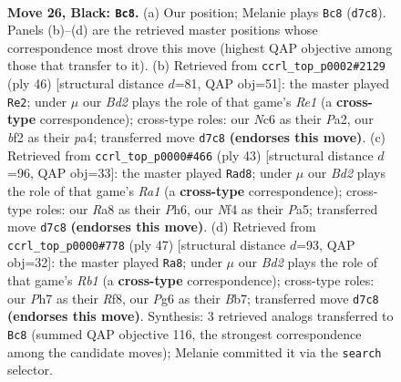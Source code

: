 \documentclass[11pt]{article}
\begin{document}
\clearpage

\begin{figure}[p]\centering
\begin{subfigure}{0.46\textwidth}\centering
\resizebox{\linewidth}{!}{%
\newchessgame
\chessboard[
  setfen={r6r/1q1b1kbp/p1npp1p1/1p2p1P1/4PnQP/2N2P2/PPPK1B2/R1R2B2 b - - 4 26},
  showmover=false,
  pgfstyle=straightmove, color=movearrow, markmove={d7-c8}
]}
\caption{}
\end{subfigure}\hfill
\begin{subfigure}{0.46\textwidth}\centering
\resizebox{\linewidth}{!}{%
\newchessgame
\chessboard[
  setfen={r4rk1/4ppb1/1np3p1/1p2Pq1p/p2PNB1P/2P3P1/P1Q2PK1/2R1R3 w - - 0 24},
  showmover=false,
  pgfstyle=straightmove, color=movearrow, markmove={e1-e2}
]}
\caption{}
\end{subfigure}
\\[4pt]
\begin{subfigure}{0.46\textwidth}\centering
\resizebox{\linewidth}{!}{%
\newchessgame
\chessboard[
  setfen={r3r1k1/1pqb1p2/2ppn2p/p3b1p1/2P1P1P1/1P2BPP1/P2QN1BK/1R2R3 b - - 3 22},
  showmover=false,
  pgfstyle=straightmove, color=movearrow, markmove={a8-d8}
]}
\caption{}
\end{subfigure}\hfill
\begin{subfigure}{0.46\textwidth}\centering
\resizebox{\linewidth}{!}{%
\newchessgame
\chessboard[
  setfen={1r3rk1/1bpq1p1p/n2b2p1/3Pp3/ppQ1P3/4BNP1/P4PBP/1R1R2K1 b - - 1 24},
  showmover=false,
  pgfstyle=straightmove, color=movearrow, markmove={b8-a8}
]}
\caption{}
\end{subfigure}
\caption{\textbf{Move 26, Black: \texttt{Bc8}.} (a) Our position; Melanie plays \texttt{Bc8} (\texttt{d7c8}). Panels (b)--(d) are the retrieved master positions whose correspondence most drove this move (highest QAP objective among those that transfer to it). (b) Retrieved from \texttt{ccrl\_top\_p0002\#2129} (ply 46) [structural distance $d$=81, QAP obj=51]: the master played \texttt{Re2}; under $\mu$ our \emph{Bd2} plays the role of that game's \emph{Re1} (a \textbf{cross-type} correspondence); cross-type roles: our \emph{N}c6 as their \emph{P}a2, our \emph{b}f2 as their \emph{p}a4; transferred move \texttt{d7c8} \textbf{(endorses this move)}. (c) Retrieved from \texttt{ccrl\_top\_p0000\#466} (ply 43) [structural distance $d$=96, QAP obj=33]: the master played \texttt{Rad8}; under $\mu$ our \emph{Bd2} plays the role of that game's \emph{Ra1} (a \textbf{cross-type} correspondence); cross-type roles: our \emph{R}a8 as their \emph{P}h6, our \emph{N}f4 as their \emph{P}a5; transferred move \texttt{d7c8} \textbf{(endorses this move)}. (d) Retrieved from \texttt{ccrl\_top\_p0000\#778} (ply 47) [structural distance $d$=93, QAP obj=32]: the master played \texttt{Ra8}; under $\mu$ our \emph{Bd2} plays the role of that game's \emph{Rb1} (a \textbf{cross-type} correspondence); cross-type roles: our \emph{P}h7 as their \emph{R}f8, our \emph{P}g6 as their \emph{B}b7; transferred move \texttt{d7c8} \textbf{(endorses this move)}. Synthesis: 3 retrieved analogs transferred to \texttt{Bc8} (summed QAP objective 116, the strongest correspondence among the candidate moves); Melanie committed it via the \texttt{search} selector.}

\end{figure}
\end{document}
